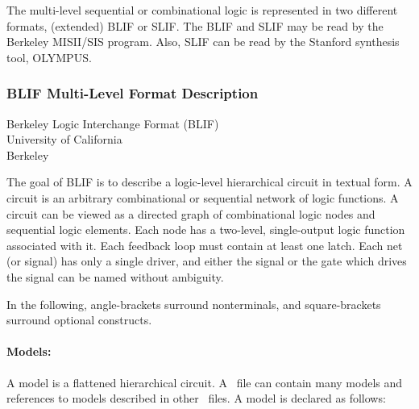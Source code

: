 {\begin{pespace}
The multi-level sequential or combinational logic is represented 
in two different formats, (extended)
BLIF or SLIF.  
The BLIF and SLIF 
may be read by the Berkeley MISII/SIS program.  
Also, SLIF can be read by the Stanford synthesis tool, OLYMPUS.


\subsubsection{BLIF Multi-Level Format Description}



\begin{center}
{\large

                  Berkeley Logic Interchange Format (BLIF)\\

                          University of California\\
                                  Berkeley\\ }
\end{center}


The goal of BLIF is to describe a logic-level hierarchical circuit in
textual form.  A circuit is an arbitrary combinational or sequential network
of logic functions.  A circuit can be viewed as a directed graph of
combinational logic nodes and sequential logic elements.  Each node has a
two-level, single-output logic function associated with it.  Each feedback
loop must contain at least one latch.  Each net (or signal) has only a
single driver, and either the signal or the gate which drives the signal can
be named without ambiguity.

In the following, angle-brackets surround nonterminals, and square-brackets
surround optional constructs.

\paragraph{Models:}

A model is a flattened hierarchical circuit.  A \BLIF\ file can contain many
models and references to models described in other \BLIF\ files.  A model is
declared as follows:


\end{pespace}}
